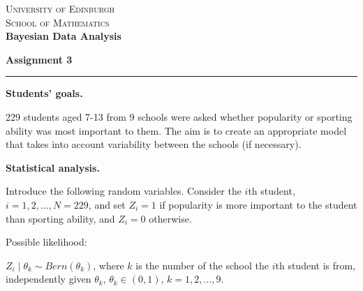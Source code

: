 \documentclass[11pt]{report}
\begin{document}
\def \bbeta{\mbox {\boldmath $\beta$}}
\def \btheta{\mbox {\boldmath $\theta$}}
\def \bmu{\mbox {\boldmath $\mu$}}
\def \ttheta{{\theta}}
\def \tmu{{\mu}}
\def \tbu{{\bf U}}
\def \tby{{\bf Y}}
\def \tbz{{\bf Z}}
\def \ta{{A}}
\def \tb{{B}}
\def \tn{{N}}
\def \tr{{R}}
\def \ts{{S}}
\def \tt{{T}}
\def \tu{{U}}
\def \tx{{X}}
\def \ty{{Y}}
\def \tz{{Z}}
\def \bb{\bf b}
\def \bm{\bf m}
\def \bn{\bf n}
\def \by{\bf y}
\def \bz{\bf z}
\def \bX{\bf X}

\begin{center}
\vspace*{-.5cm}\textsc{University of Edinburgh}\\
\textsc{School of Mathematics}\\
\vspace{.25cm} \textbf{\large Bayesian Data Analysis}
\end{center}

\textbf{ Assignment 3}
\vspace{.2cm}
\hrule
\vspace{0.2cm}

\begin{center}
{\bf Students' goals.}
\end{center}

\vspace{0.3cm}

229 students aged 7-13 from 9 schools were asked whether popularity or sporting ability was most important to them. The aim is to create an appropriate model that takes into account variability between the schools (if necessary).

{\bf Statistical analysis.}

Introduce the following random variables. Consider the $i$th student, $i=1,2,\ldots, N = 229$, and set $Z_i = 1$ if popularity is more important to the student than sporting ability, and $Z_i=0$ otherwise.


Possible likelihood:

 $Z_i \mid \theta_k \sim Bern(\theta_k)$, where $k$ is the number of the school the $i$th student is from,
 independently given $\theta_k$,  $\theta_k \in (0,1)$, $k=1,2,\ldots, 9$.
\end{document}
